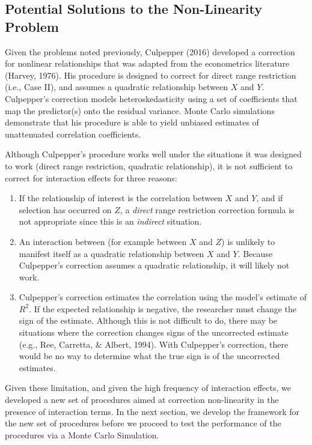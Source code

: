 \documentclass[man, babel,english]{apa}%
\begin{document}
\subsection{Potential Solutions to the Non-Linearity Problem}

Given the problems noted previously, Culpepper (2016) developed a correction for nonlinear relationships that was adapted from the econometrics literature (Harvey, 1976). His procedure is designed to correct for direct range restriction (i.e., Case II), and assumes a quadratic relationship between $X$ and $Y.$ Culpepper's correction models heteroskedasticity using a set of coefficients that map the predictor(s) onto the residual variance. Monte Carlo simulations demonstrate that his procedure is able to yield unbiased estimates of unattenuated correlation coefficients. 

Although Culpepper's procedure works well under the situations it was designed to work (direct range restriction, quadratic relationship), it is not sufficient to correct for interaction effects for three reasons:
\begin{enumerate}
\item If the relationship of interest is the correlation between $X$ and $Y$, and if selection has occurred on $Z$, a \emph{direct} range restriction correction formula is not appropriate since this is an \emph{indirect} situation. 
\item An interaction between (for example between $X$ and $Z$) is unlikely to manifest itself as a quadratic relationship between $X$ and $Y$. Because Culpepper's correction assumes a quadratic relationship, it will likely not work. 
\item Culpepper's correction estimates the correlation using the model's estimate of $R^2$. If the expected relationship is negative, the researcher must change the sign of the estimate. Although this is not difficult to do, there may be situations where the correction changes signs of the uncorrected estimate (e.g., Ree, Carretta, \& Albert, 1994). With Culpepper's correction, there would be no way to determine what the true sign is of the uncorrected estimates. 
\end{enumerate}

Given these limitation, and given the high frequency of interaction effects, we developed a new set of procedures aimed at correction non-linearity in the presence of interaction terms. In the next section, we develop the framework for the new set of procedures before we proceed to test the performance of the procedures via a Monte Carlo Simulation. 
\end{document}
